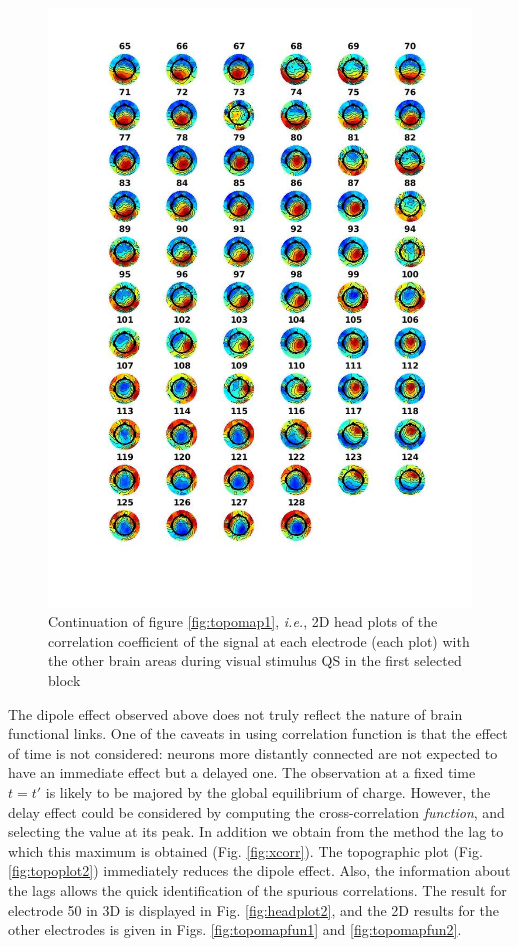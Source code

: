 \documentclass[a4paper]{article}
\begin{document}
\begin{figure}
    \centering
    \includegraphics[width=16cm]{map2.jpg}
    \caption{Continuation of figure \ref{fig:topomap1}, \textit{i.e.}, 2D head plots of the correlation coefficient of the signal at each electrode (each plot) with the other brain areas during visual stimulus QS in the first selected block}
    \label{fig:topomap2}
\end{figure}

\newpage

The dipole effect observed above does not truly reflect the nature of brain functional links. One of the caveats in using correlation function is that the effect of time is not considered: neurons more distantly connected are not expected to have an immediate effect but a delayed one. The observation at a fixed time $t=t'$ is likely to be majored by the global equilibrium of charge. However, the delay effect could be considered by computing the cross-correlation \textit{function}, and selecting the value at its peak. In addition we obtain from the method the lag to which this maximum is obtained (Fig. \ref{fig:xcorr}). The topographic plot (Fig. \ref{fig:topoplot2}) immediately reduces the dipole effect. Also, the information about the lags allows the quick identification of the spurious correlations. The result for electrode 50 in 3D is displayed in Fig. \ref{fig:headplot2}, and the 2D results for the other electrodes is given in Figs. \ref{fig:topomapfun1} and \ref{fig:topomapfun2}.
\end{document}
